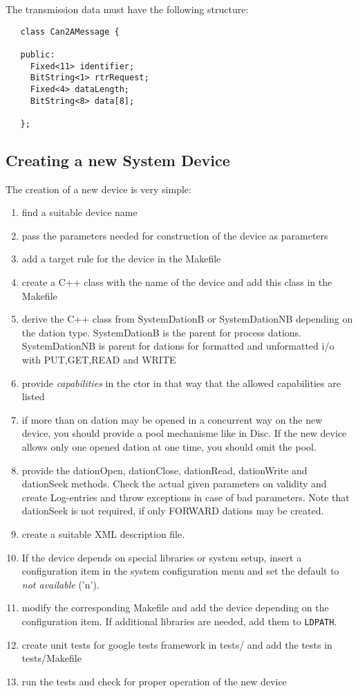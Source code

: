 The transmission data must have the following structure:

\begin{verbatim}
   class Can2AMessage {

   public:
     Fixed<11> identifier;
     BitString<1> rtrRequest;
     Fixed<4> dataLength;
     BitString<8> data[8];

   };
\end{verbatim}




\subsection{Creating a new System Device}
The creation of a new device is very simple:
\begin{enumerate}
\item find a suitable device name
\item pass the parameters needed for construction of the device as
      parameters
\item add a target rule for the device in the Makefile
\item create a C++ class with the name of the device and add this class
      in the Makefile
\item derive the C++ class from SystemDationB or SystemDationNB depending
      on the dation type. SystemDationB is the parent for process dations.
      SystemDationNB is parent for dations for formatted and unformatted
      i/o with PUT,GET,READ and WRITE
\item provide {\em capabilities} in the ctor in that way that the allowed
      capabilities are listed
\item if more than on dation may be opened in a concurrent way on the new
      device, you should provide a pool mechanisme like in Disc.
      If the new device allows only one opened dation at one time, you 
      should omit the pool.
\item provide the dationOpen, dationClose, dationRead, dationWrite 
      and dationSeek methods. Check the actual given parameters on
      validity and create Log-entries and throw exceptions in case
      of bad parameters.
      Note that dationSeek is not required, if only FORWARD dations
      may be created.
\item create a suitable XML description file.
\item If the device depends on special libraries or 
      system setup, insert a configuration item  
      in the system configuration menu
      and set the default to {\em not available} ('n').
\item modify the corresponding Makefile and add the device depending on
      the configuration item. If additional libraries are needed,
      add them to \texttt{LDPATH}. 
\item create unit tests for google tests framework in tests/ and add the
      tests in tests/Makefile
\item run the tests and check for proper operation of the new device
\end{enumerate}

